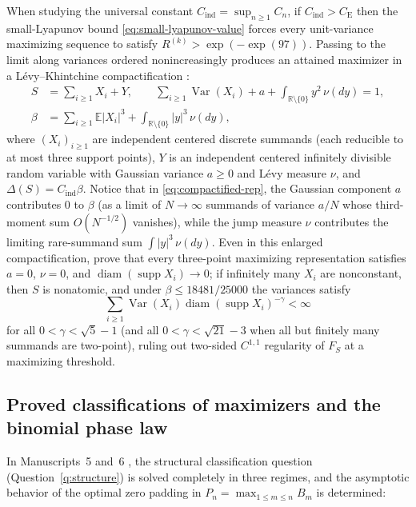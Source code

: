 \documentclass[11pt]{article}
\numberwithin{equation}{section}
\theoremstyle{definition}
\theoremstyle{remark}
\DeclareMathOperator{\Var}{Var}
\DeclareMathOperator{\supp}{supp}
\newcommand{\E}{\mathbb E}
\newcommand{\R}{\mathbb R}
\newcommand{\ce}{C_{\mathrm E}}
\newcommand{\Cind}{C_{\mathrm{ind}}}
\begin{document}
When studying the universal constant $\Cind=\sup_{n\ge1}C_n$, if $\Cind>\ce$
then the small-Lyapunov bound \eqref{eq:small-lyapunov-value} forces every
unit-variance maximizing sequence to satisfy $R^{(k)}>\exp(-\exp(97))$.
Passing to the limit along variances ordered nonincreasingly produces an
attained maximizer in a L\'evy--Khintchine compactification
\citep[Definition~1.1 and Theorem~1.1]{BellExtremizers2026}:
\begin{equation}\label{eq:compactified-rep}
\begin{aligned}
 S&=\sum_{i\ge1}X_i+Y,\qquad
 \sum_{i\ge1}\Var(X_i)+a+\int_{\R\setminus\{0\}}y^2\,\nu(dy)=1,\\
 \beta&=\sum_{i\ge1}\E|X_i|^3+\int_{\R\setminus\{0\}}|y|^3\,\nu(dy),
\end{aligned}
\end{equation}
where $(X_i)_{i\ge1}$ are independent centered discrete summands (each
reducible to at most three support points), $Y$ is an independent centered
infinitely divisible random variable with Gaussian variance $a\ge0$ and
L\'evy measure $\nu$, and $\Delta(S)=\Cind\beta$. Notice that in
\eqref{eq:compactified-rep}, the Gaussian component $a$ contributes $0$ to
$\beta$ (as a limit of $N\to\infty$ summands of variance $a/N$ whose
third-moment sum $O(N^{-1/2})$ vanishes), while the jump measure $\nu$
contributes the limiting rare-summand sum $\int|y|^3\,\nu(dy)$. Even in this
enlarged compactification, \citet[Theorems~1.1 and~1.2]{BellExtremizers2026}
prove that every three-point maximizing representation satisfies $a=0$,
$\nu=0$, and $\operatorname{diam}(\supp X_i)\to0$; if infinitely many $X_i$
are nonconstant, then $S$ is nonatomic, and under $\beta\le18481/25000$ the
variances satisfy
\[
 \sum_{i\ge1}\Var(X_i)\operatorname{diam}(\supp X_i)^{-\gamma}<\infty
\]
for all $0<\gamma<\sqrt5-1$ (and all $0<\gamma<\sqrt{21}-3$ when all but
finitely many summands are two-point), ruling out two-sided $C^{1,1}$
regularity of $F_S$ at a maximizing threshold.

\subsection{Proved classifications of maximizers and the binomial phase law}\label{subsec:proved-classifications}

In Manuscripts~5 and~6 \citep{BellBernoulli2026,BellSmallStructure2026}, the
structural classification question (Question~\ref{q:structure}) is solved
completely in three regimes, and the asymptotic behavior of the optimal zero
padding in $P_n=\max_{1\le m\le n}B_m$ is determined:
\end{document}
